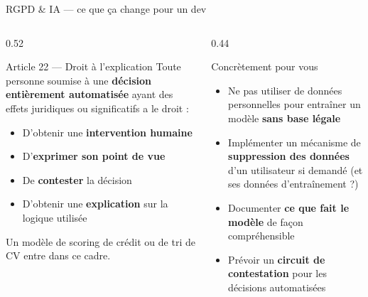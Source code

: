 \documentclass[aspectratio=169, 10pt]{beamer}
\begin{document}
\begin{frame}{RGPD \& IA --- ce que ça change pour un dev}
  \begin{columns}[T]
    \begin{column}{0.52\textwidth}
      \begin{alertblock}{Article 22 --- Droit à l'explication}
        Toute personne soumise à une \textbf{décision
        entièrement automatisée} ayant des effets
        juridiques ou significatifs a le droit :
        \begin{itemize}
          \item D'obtenir une \textbf{intervention humaine}
          \item D'\textbf{exprimer son point de vue}
          \item De \textbf{contester} la décision
          \item D'obtenir une \textbf{explication}
                sur la logique utilisée
        \end{itemize}
        \vspace{2pt}
        \small Un modèle de scoring de crédit
        ou de tri de CV entre dans ce cadre.
      \end{alertblock}
    \end{column}
    \begin{column}{0.44\textwidth}
      \begin{block}{Concrètement pour vous}
        \begin{itemize}
          \item Ne pas utiliser de données personnelles
                pour entraîner un modèle
                \textbf{sans base légale}
          \item Implémenter un mécanisme de
                \textbf{suppression des données}
                d'un utilisateur si demandé
                (et ses données d'entraînement ?)
          \item Documenter \textbf{ce que fait le modèle}
                de façon compréhensible
          \item Prévoir un \textbf{circuit de contestation}
                pour les décisions automatisées
        \end{itemize}
      \end{block}
    \end{column}
  \end{columns}
\end{frame}

\end{document}
